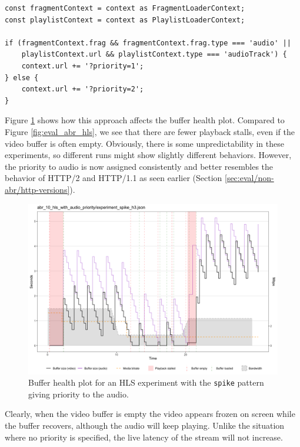\begin{verbatim}
const fragmentContext = context as FragmentLoaderContext;
const playlistContext = context as PlaylistLoaderContext;

if (fragmentContext.frag && fragmentContext.frag.type === 'audio' ||
    playlistContext.url && playlistContext.type === 'audioTrack') {
    context.url += '?priority=1';
} else {
    context.url += '?priority=2';
}
\end{verbatim}

Figure \ref{fig:improvements_hls_pri} shows how this approach affects the buffer health plot. Compared to Figure \ref{fig:eval_abr_hls}, we see that there are fewer playback stalls, even if the video buffer is often empty. Obviously, there is some unpredictability in these experiments, so different runs might show slightly different behaviors. However, the priority to audio is now assigned consistently and better resembles the behavior of HTTP/2 and HTTP/1.1 as seen earlier (Section \ref{sec:eval/non-abr/http-versions}).

\begin{figure}[h]
    \centering
    \includegraphics[width=\textwidth]{res/impr_hls_pri.png}
    \caption{Buffer health plot for an HLS experiment with the \texttt{spike} pattern giving priority to the audio.}
    \label{fig:improvements_hls_pri}
\end{figure}

Clearly, when the video buffer is empty the video appears frozen on screen while the buffer recovers, although the audio will keep playing. Unlike the situation where no priority is specified, the live latency of the stream will not increase.

